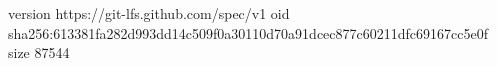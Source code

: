 version https://git-lfs.github.com/spec/v1
oid sha256:613381fa282d993dd14c509f0a30110d70a91dcec877c60211dfc69167cc5e0f
size 87544
